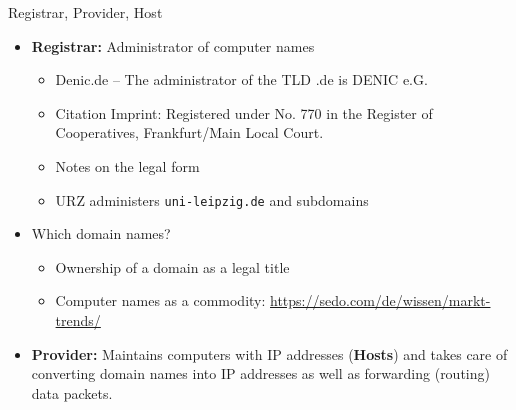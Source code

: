 \documentclass{beamer}
\begin{document}
\begin{frame}{Registrar, Provider, Host}
\begin{itemize}
\item \textbf{Registrar:} Administrator of computer names
  \begin{itemize}
  \item Denic.de -- The administrator of the TLD .de is DENIC e.G.
  \item Citation Imprint: Registered under No. 770 in the Register of
    Cooperatives, Frankfurt/Main Local Court.
  \item Notes on the legal form
  \item URZ administers \texttt{uni-leipzig.de} and subdomains
  \end{itemize}
\item Which domain names?
  \begin{itemize}
  \item Ownership of a domain as a legal title
  \item Computer names as a commodity:
    \url{https://sedo.com/de/wissen/markt-trends/}
  \end{itemize}
\item \textbf{Provider:} Maintains computers with IP addresses
  (\textbf{Hosts}) and takes care of converting domain names into IP addresses
  as well as forwarding (routing) data packets.
\end{itemize}
\end{frame}
\end{document}
